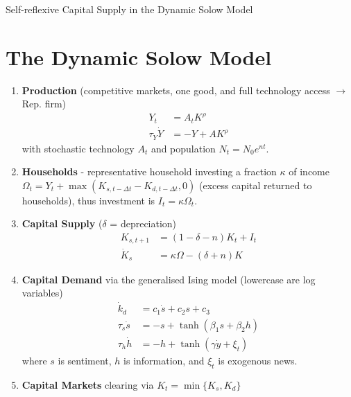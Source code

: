 \documentclass[11pt]{article}
\begin{document}
\begin{center}
\Large 
Self-reflexive Capital Supply in the Dynamic Solow Model
\end{center}

\section{The Dynamic Solow Model}
\begin{enumerate}
\item \textbf{Production} (competitive markets, one good, and full technology access $\rightarrow$ Rep. firm)
\begin{align}
Y_t &= A_tK^{\rho}\\
\tau_Y\dot{Y} &= -Y + AK^{\rho}
\end{align}
with stochastic technology $A_t$ and population $N_t=N_0e^{nt}$. 

\item \textbf{Households} - representative household investing a  fraction $\kappa$ of income $\Omega_t = Y_t + \max(K_{s,t-\Delta t}-K_{d,t-\Delta t},0)$ (excess capital returned to households), thus investment is $I_t = \kappa \Omega_t$.

\item \textbf{Capital Supply} ($\delta$ = depreciation)
\begin{align}
K_{s,t+1} &= (1-\delta-n)K_t + I_t\\
\dot{K}_s &= \kappa \Omega - (\delta+n)K
\end{align}

\item \textbf{Capital Demand} via the generalised Ising model (lowercase are log variables)
\begin{subequations}\label{eq_dyn_system_0}
\begin{align}
\dot{k}_d&=c_1 \dot{s} + c_2 s + c_3 \label{eq_dyn_kd}\\
\tau_s \dot{s}&=-s + \tanh( \beta_1 s + \beta_2 h) \label{eq_sentiment}\\
\tau_h \dot{h}&=-h + \tanh(\gamma \dot{y} + \xi_t)\label{eq_info}
\end{align}
\end{subequations} where $s$ is sentiment, $h$ is information, and $\xi_t$ is exogenous news. 

\item \textbf{Capital Markets} clearing via $K_t=\min\{K_s,K_d\}$
\end{enumerate}
\end{document}
